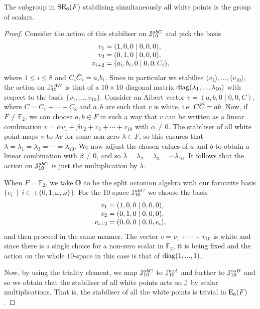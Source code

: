 \begin{lemma}
	The subgroup in $\mathrm{SE}_6(F)$ stabilising simultaneously all white points
	is the group of scalars.  
\end{lemma}

\begin{proof}
 Consider the action of
this stabiliser on $\mathbb{J}_{10}^{abC}$ and pick the basis
\begin{equation}
	\begin{array}{r@{\;}c@{\;}l}
		v_1 & = & (1,0,0\mid 0,0,0), \\
		v_2 & = & (0,1,0\mid 0,0,0), \\
		v_{i+2} & = & (a_i, b_i,0\mid 0,0,C_i),
	\end{array}
\end{equation} 
where $1 \leqslant i \leqslant 8$ and $C_i \mathord{\mbox{\hspace*{0pt}}\,\overline{\!C\!\!\;}\!\:}\mbox{\hspace*{0pt}}_i = a_i b_i$. Since in particular we stabilise
$\langle v_1 \rangle,...,\langle v_{10}\rangle$, the action on $\mathbb{J}_{10}^{cAB}$ is that of a 
$10 \times 10$ diagonal matrix $\mathrm{diag}(\lambda_1, ..., \lambda_{10})$ 
with respect to the basis $\{v_1, ..., v_{10}\}$. Consider 
an Albert vector $v = (a,b,0\mid 0,0,C)$, where $C = C_1 + \cdots + C_8$ and 
$a,b$ are such that $v$ is white, i.e. $C\mathord{\mbox{\hspace*{0pt}}\,\overline{\!C\!\!\;}\!\:}\mbox{\hspace*{0pt}} = ab$. Now, if $F\neq \mathbb{F}_2$, we can choose
$a,b \in F$ in such a way that $v$ can be written as a linear combination 
$v = \alpha v_1 + \beta v_2 + v_3 + \cdots + v_{10}$ with $\alpha \neq 0$. The stabiliser of 
all white point maps $v$ to $\lambda v$ for some non-zero $\lambda \in F$, so this ensures
that $\lambda = \lambda_1 = \lambda_3 = \cdots = \lambda_{10}$. We now adjust the chosen values
of $a$ and $b$ to obtain a linear combination with $\beta \neq 0$, and so $\lambda = 
\lambda_2 = \lambda_3 = \cdots \lambda_{10}$. It follows that the action on $\mathbb{J}_{10}^{abC}$ 
is just the multiplication by $\lambda$. 

When $F = \mathbb{F}_2$, we take $\mathbb{O}$ to be the split octonion algebra with 
our favourite basis $\{ e_i\ \mid\ i \in \pm \{0,1,\omega,\bar{\omega}\}\}$. For the 
$10$-space $\mathbb{J}_{10}^{abC}$ we choose the basis 
\begin{equation}
	\begin{array}{r@{\;}c@{\;}l}
		v_1 & = & (1,0,0\mid 0,0,0), \\
		v_2 & = & (0,1,0\mid 0,0,0), \\
		v_{i+2} & = & (0,0,0\mid 0,0,e_i),
	\end{array}
\end{equation} 
and then proceed in the same manner. The vector $v = v_1 + \cdots + v_{10}$ is white and since 
there is a single choice for a non-zero scalar in $\mathbb{F}_2$, it is being fixed and 
the action on the whole $10$-space in this case is that of $\mathrm{diag}(1,..., 1)$. 

Now, by using the triality element, we map $\mathbb{J}_{10}^{abC}$ to $\mathbb{J}_{10}^{bcA}$ and further
to $\mathbb{J}_{10}^{caB}$ and so we obtain that the stabiliser of all white points
acts on $\mathbb{J}$ by scalar multiplications. That is, the stabiliser of all the white points
is trivial in $\mathord{\mathrm{E}}_6(F)$. 

\end{proof}

